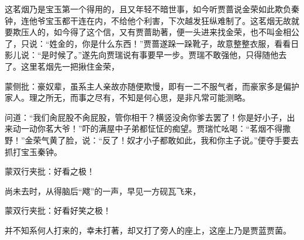 \begin{parag}


    这茗烟乃是宝玉第一个得用的，且又年轻不暗世事，如今听贾蔷说金荣如此欺负秦钟，连他爷宝玉都干连在内，不给他个利害，下次越发狂纵难制了。这茗烟无故就要欺压人的，如今得了这个信，又有贾蔷助著，便一头进来找金荣，也不叫金相公了，只说：“姓金的，你是什么东西！”贾蔷遂跺一跺靴子，故意整整衣服，看看日影儿说：“是时候了。”遂先向贾瑞说有事要早一步。贾瑞不敢强他，只得随他去了。这里茗烟先一把揪住金荣，\begin{note}蒙侧批：豪奴辈，虽系主人亲故亦随便欺慢，即有一二不服气者，而豪家多是偏护家人。理之所无，而事之尽有，不知是何心思，是非凡常可能测略。\end{note}问道：“我们肏屁股不肏屁股，管你相干？横竖没肏你爹去罢了！你是好小子，出来动一动你茗大爷！”吓的满屋中子弟都怔怔的痴望。贾瑞忙吆喝：“茗烟不得撒野！”金荣气黄了脸，说：“反了！奴才小子都敢如此，我和你主子说。”便夺手要去抓打宝玉秦钟。\begin{note}蒙双行夹批：好看之极！\end{note}尚未去时，从得脑后“飕”的一声，早见一方砚瓦飞来，\begin{note}蒙双行夹批：好看好笑之极！\end{note}并不知系何人打来的，幸未打著，却又打了旁人的座上，这座上乃是贾蓝贾菌。
\end{parag}


